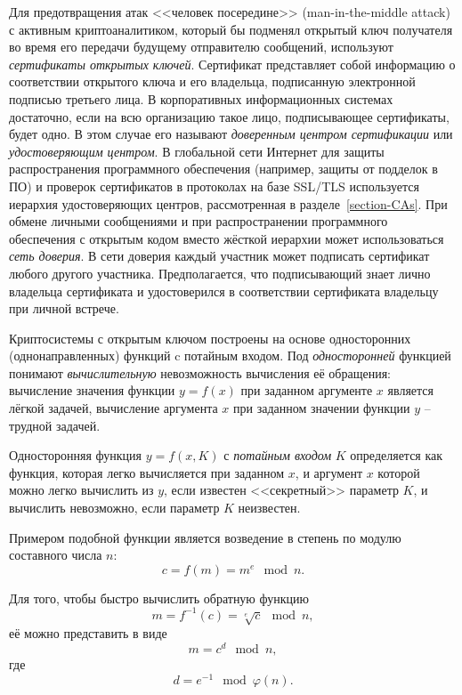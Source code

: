 Для предотвращения атак <<человек посередине>> (man-in-the-middle attack) с активным криптоаналитиком, который бы подменял открытый ключ получателя во время его передачи будущему отправителю сообщений, используют \emph{сертификаты открытых ключей}. Сертификат представляет собой информацию о соответствии открытого ключа и его владельца, подписанную электронной подписью третьего лица. В корпоративных информационных системах достаточно, если на всю организацию такое лицо, подписывающее сертификаты, будет одно. В этом случае его называют \emph{доверенным центром сертификации} или \emph{удостоверяющим центром}. В глобальной сети Интернет для защиты распространения программного обеспечения (например, защиты от подделок в ПО) и проверок сертификатов в протоколах на базе SSL/TLS используется иерархия удостоверяющих центров, рассмотренная в разделе~\ref{section-CAs}. При обмене личными сообщениями и при распространении программного обеспечения с открытым кодом вместо жёсткой иерархии может использоваться \emph{сеть доверия}. В сети доверия каждый участник может подписать сертификат любого другого участника. Предполагается, что подписывающий знает лично владельца сертификата и удостоверился в соответствии сертификата владельцу при личной встрече.

Криптосистемы с открытым ключом построены на основе односторонних (однонаправленных) функций c потайным входом. Под \emph{односторонней} функцией понимают \emph{вычислительную} невозможность вычисления её обращения: вычисление значения функции $y = f(x)$ при заданном аргументе $x$ является лёгкой задачей, вычисление аргумента $x$ при заданном значении функции $y$ -- трудной задачей.

Односторонняя функция $y = f(x,K)$ с \emph{потайным входом} $K$ определяется как функция, которая легко вычисляется при заданном $x$, и аргумент $x$ которой можно легко вычислить из $y$, если известен <<секретный>> параметр $K$, и вычислить невозможно, если параметр $K$ неизвестен.

Примером подобной функции является возведение в степень по модулю составного числа $n$:
	\[ c = f \left( m \right) = m ^ e \mod n.\]

Для того, чтобы быстро вычислить обратную функцию
	\[ m = f^{-1} \left( c \right) = \sqrt[e]{c} \mod n, \]
её можно представить в виде
	\[ m = c^{d} \mod n,\]
где
	\[ d = e^{-1} \mod \varphi \left( n \right). \]

